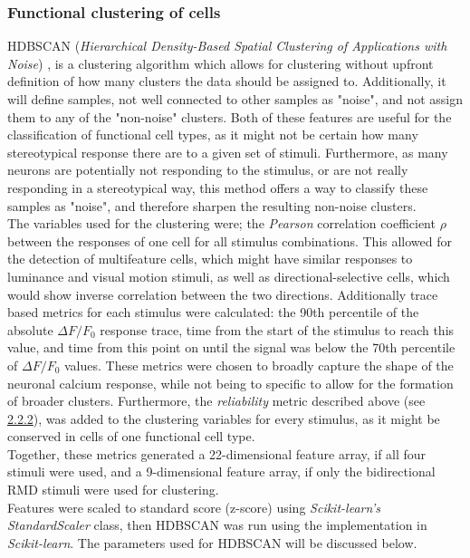 \documentclass[12pt, a4paper, oneside]{article}
\begin{document}
\subsubsection{Functional clustering of cells}
\label{sec:met clustering}
HDBSCAN (\textit{Hierarchical Density-Based Spatial Clustering of Applications with Noise}) \parencite{campelloDensityBasedClusteringBased2013, campelloHierarchicalDensityEstimates2015}, is a clustering algorithm which allows for clustering without upfront definition of how many clusters the data should be assigned to. Additionally, it will define samples, not well connected to other samples as "noise", and not assign them to any of the "non-noise" clusters. Both of these features are useful for the classification of functional cell types, as it might not be certain how many stereotypical response there are to a given set of stimuli. Furthermore, as many neurons are potentially not responding to the stimulus, or are not really responding in a stereotypical way, this method offers a way to classify these samples as "noise", and therefore sharpen the resulting non-noise clusters.\\
The variables used for the clustering were; the \textit{Pearson} correlation coefficient $\rho$ between the responses of one cell for all stimulus combinations. This allowed for the detection of multifeature cells, which might have similar responses to luminance and visual motion stimuli, as well as directional-selective cells, which would show inverse correlation between the two directions. Additionally trace based metrics for each stimulus were calculated: the 90th percentile of the absolute $\Delta F/F_0$ response trace, time from the start of the stimulus to reach this value, and time from this point on until the signal was below the 70th percentile of $\Delta F/F_0$ values. These metrics were chosen to broadly capture the shape of the neuronal calcium response, while not being to specific to allow for the formation of broader clusters. Furthermore, the \textit{reliability} metric described above (see \hyperref[sec:dtw trials]{2.2.2}), was added to the clustering variables for every stimulus, as it might be conserved in cells of one functional cell type.\\
Together, these metrics generated a 22-dimensional feature array, if all four stimuli were used, and a 9-dimensional feature array, if only the bidirectional RMD stimuli were used for clustering.\\
Features were scaled to standard score (z-score) using \textit{Scikit-learn's} \parencite{pedregosaScikitlearnMachineLearning2011} \textit{StandardScaler} class, then HDBSCAN was run using the implementation in \textit{Scikit-learn}. The parameters used for HDBSCAN will be discussed below.\\
\end{document}
